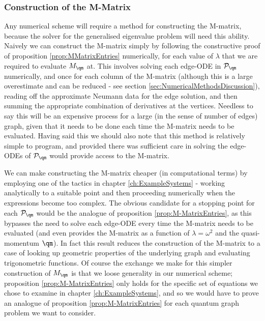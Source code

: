 \subsubsection{Construction of the M-Matrix} \label{sec:ConcFutureConstructM}
Any numerical scheme will require a method for constructing the M-matrix, because the solver for the generalised eigenvalue problem will need this ability.
Naively we can construct the M-matrix simply by following the constructive proof of proposition \ref{prop:MMatrixEntries} numerically, for each value of $\lambda$ that we are required to evaluate $M_{\qm}$ at.
This involves solving each edge-ODE in $\mathcal{P}_{\qm}$ numerically, and once for each column of the M-matrix (although this is a large overestimate and can be reduced - see section \ref{sec:NumericalMethodsDiscussion}), reading off the approximate Neumann data for the edge solution, and then summing the appropriate combination of derivatives at the vertices.
Needless to say this will be an expensive process for a large (in the sense of number of edges) graph, given that it needs to be done each time the M-matrix needs to be evaluated.
Having said this we should also note that this method is relatively simple to program, and provided there was sufficient care in solving the edge-ODEs of $\mathcal{P}_{\qm}$ would provide access to the M-matrix. \newline

We can make constructing the M-matrix cheaper (in computational terms) by employing one of the tactics in chapter \ref{ch:ExampleSystems} - working analytically to a suitable point and then proceeding numerically when the expressions become too complex.
The obvious candidate for a stopping point for each $\mathcal{P}_{\qm}$ would be the analogue of proposition \ref{prop:M-MatrixEntries}, as this bypasses the need to solve each edge-ODE every time the M-matrix needs to be evaluated (and even provides the M-matrix as a function of $\lambda=\omega^2$ and the quasi-momentum $\qm$).
In fact this result reduces the construction of the M-matrix to a case of looking up geometric properties of the underlying graph and evaluating trigonometric functions.
Of course the exchange we make for this simpler construction of $M_{\qm}$ is that we loose generality in our numerical scheme; proposition \ref{prop:M-MatrixEntries} only holds for the specific set of equations we chose to examine in chapter \ref{ch:ExampleSystems}, and so we would have to prove an analogue of proposition \ref{prop:M-MatrixEntries} for each quantum graph problem we want to consider. \newline

